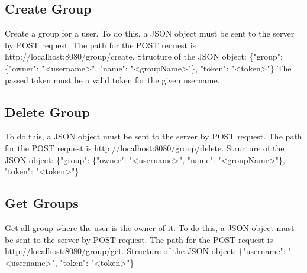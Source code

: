 \documentclass[12pt]{scrartcl}
\begin{document}
    \subsection{Create Group}
        Create a group for a user.
        To do this, a JSON object must be sent to the server by POST request. The path for the POST request is
        {http://localhost:8080/group/create}.
        Structure of the JSON object: \{"group": \{"owner": "<username>", "name": "<groupName>"\}, "token": "<token>"\}
        The passed token must be a valid token for the given username.

    \subsection{Delete Group}
        To do this, a JSON object must be sent to the server by POST request. The path for the POST request is
        {http://localhost:8080/group/delete}.
        Structure of the JSON object: \{"group": \{"owner": "<username>", "name": "<groupName>"\}, "token": "<token>"\}

    \subsection{Get Groups}
        Get all group where the user is the owner of it.
        To do this, a JSON object must be sent to the server by POST request. The path for the POST request is
        {http://localhost:8080/group/get}.
        Structure of the JSON object: \{"username": "<username>", "token": "<token>"\}
\end{document}
